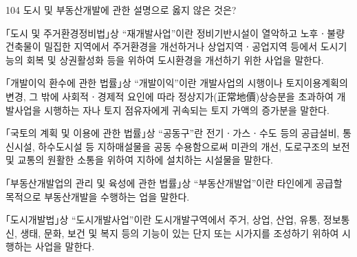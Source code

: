 \begin{question}{104}
도시 및 부동산개발에 관한 설명으로 옳지 않은 것은?
\begin{choices}
  \item ｢도시 및 주거환경정비법｣상 “재개발사업”이란 정비기반시설이 열악하고 노후ㆍ불량 건축물이 밀집한 지역에서 주거환경을 개선하거나 상업지역ㆍ공업지역 등에서 도시기능의 회복 및 상권활성화 등을 위하여 도시환경을 개선하기 위한 사업을 말한다.
  \item ｢개발이익 환수에 관한 법률｣상 “개발이익”이란 개발사업의 시행이나 토지이용계획의 변경, 그 밖에 사회적ㆍ경제적 요인에 따라 정상지가(正常地價)상승분을 초과하여 개발사업을 시행하는 자나 토지 점유자에게 귀속되는 토지 가액의 증가분을 말한다.
  \item ｢국토의 계획 및 이용에 관한 법률｣상 “공동구”란 전기ㆍ가스ㆍ수도 등의 공급설비, 통신시설, 하수도시설 등 지하매설물을 공동 수용함으로써 미관의 개선, 도로구조의 보전 및 교통의 원활한 소통을 위하여 지하에 설치하는 시설물을 말한다.
  \item ｢부동산개발업의 관리 및 육성에 관한 법률｣상 “부동산개발업”이란 타인에게 공급할 목적으로 부동산개발을 수행하는 업을 말한다.
  \item ｢도시개발법｣상 “도시개발사업”이란 도시개발구역에서 주거, 상업, 산업, 유통, 정보통신, 생태, 문화, 보건 및 복지 등의 기능이 있는 단지 또는 시가지를 조성하기 위하여 시행하는 사업을 말한다.
\end{choices}
\end{question}
